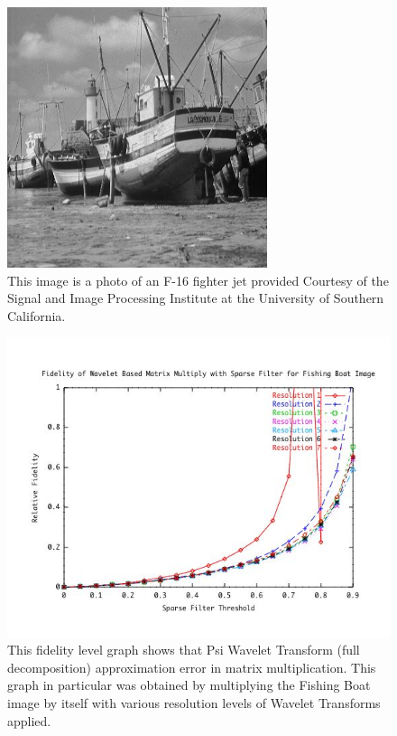 \begin{figure}
\includegraphics [width=3in]{fishingboat.jpg}
\caption{This image is a photo of an F-16 fighter jet provided Courtesy of the Signal and Image Processing Institute at the University of Southern California.  \cite{fishingboat}}
\label{image_fishingboat}
\end{figure}



\begin{figure}
\includegraphics [width=5.5in]{fishingboatresultA.jpg}
\caption{This fidelity level graph shows that Psi Wavelet Transform (full decomposition) approximation error in matrix multiplication.  This graph in particular was obtained by multiplying the Fishing Boat image by itself with various resolution levels of Wavelet Transforms applied. \cite{fishingboat}  }
\label{image_fishingboat_fidelity}
\end{figure}


